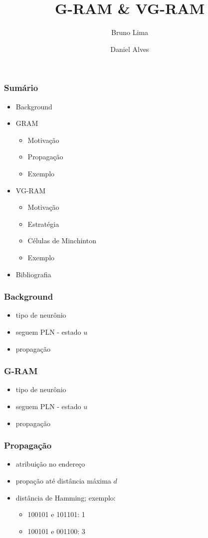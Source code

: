 \documentclass{beamer}
\title{G-RAM \& VG-RAM}
\author{Bruno Lima \and Daniel Alves}
\date{}
\begin{document}
\titlepage

\begin{frame}
    \frametitle{Sumário}
    \begin{itemize}
        \item Background 
        \item GRAM
		\begin{itemize}
			\item Motivação
			\item Propagação
			\item Exemplo
		\end{itemize}
        \item VG-RAM
		\begin{itemize}
			\item Motivação
			\item Estratégia
			\item Células de Minchinton
			\item Exemplo
		\end{itemize}
		\item Bibliografia
    \end{itemize}
\end{frame}
\begin{frame}
    \frametitle{Background}
    \begin{itemize}
        \item tipo de neurônio
        \item seguem PLN - estado $u$
        \item propagação
    \end{itemize}
\end{frame}
\begin{frame}
    \frametitle{G-RAM}
    \begin{itemize}
        \item tipo de neurônio
        \item seguem PLN - estado $u$
        \item propagação
    \end{itemize}
\end{frame}
\begin{frame}
    \frametitle{Propagação}
    \begin{itemize}
        \item atribuição no endereço
        \item propação até distância máxima $d$
        \item distância de Hamming; exemplo:
            \begin{itemize}
                \item 10\alert 0101 e 10\alert 1101: 1
                \item \alert 10\alert 010\alert 1 e \alert 00\alert 110\alert 0: 3
            \end{itemize}
    \end{itemize}
\end{frame}
\end{document}
